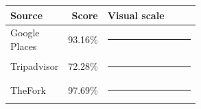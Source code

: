 {\small
\begin{tabular}{lrp{0.55\linewidth}}
\toprule
Source & Score & Visual scale \\
\midrule
Google Places & 93.16\% & \textcolor{qualityblue}{\rule{65.2mm}{5pt}} \\
Tripadvisor & 72.28\% & \textcolor{qualityblue}{\rule{50.6mm}{5pt}} \\
TheFork & 97.69\% & \textcolor{qualityblue}{\rule{68.4mm}{5pt}} \\
\bottomrule
\end{tabular}
}
